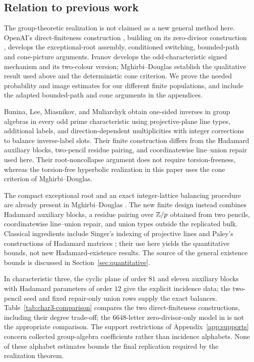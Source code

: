 \subsection{Relation to previous work}
The group-theoretic realization is not claimed as a new general method here. OpenAI's direct-finiteness construction \cite{OAI197a}, building on its zero-divisor construction \cite{OAI196}, develops the exceptional-root assembly, conditioned switching, bounded-path and cone-picture arguments. Ivanov \cite{Iva26} develops the odd-characteristic signed mechanism and its two-colour version; Mghirbi--Douglas \cite{MD26} establish the qualitative result used above and the deterministic cone criterion. We prove the needed probability and image estimates for our different finite populations, and include the adapted bounded-path and cone arguments in the appendices.

Bunina, Lee, Miasnikov, and Muliarchyk \cite{BLMM26} obtain one-sided inverses in group algebras in every odd prime characteristic using projective-plane line types, additional labels, and direction-dependent multiplicities with integer corrections to balance inverse-label slots. Their finite construction differs from the Hadamard auxiliary blocks, two-pencil residue pairing, and coordinatewise line--union repair used here. Their root-noncollapse argument does not require torsion-freeness, whereas the torsion-free hyperbolic realization in this paper uses the cone criterion of Mghirbi--Douglas.

The compact exceptional root and an exact integer-lattice balancing procedure are already present in Mghirbi--Douglas \cite[Section~7.2]{MD26}. The new finite design instead combines Hadamard auxiliary blocks, a residue pairing over $\mathbb Z/p$ obtained from two pencils, coordinatewise line--union repair, and union types outside the replicated bulk. Classical ingredients include Singer's indexing of projective lines \cite{Sin38} and Paley's constructions of Hadamard matrices \cite{Pal33}; their use here yields the quantitative bounds, not new Hadamard-existence results. The source of the general existence bounds is discussed in Section~\ref{sec:quantitative}.

In characteristic three, the cyclic plane of order $81$ and eleven auxiliary blocks with Hadamard parameters of order $12$ give the explicit incidence data; the two-pencil seed and fixed repair-only union rows supply the exact balances. Table~\ref{tab:char3-comparison} compares the two direct-finiteness constructions, including their degree trade-off; the $6648$-letter zero-divisor-only model in \cite[Section~6]{MD26} is not the appropriate comparison. The support restrictions of Appendix~\ref{app:supports} concern collected group-algebra coefficients rather than incidence alphabets. None of these alphabet estimates bounds the final replication required by the realization theorem.

